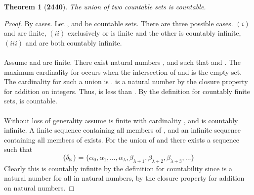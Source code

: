 \documentclass[preview]{standalone}
\newtheorem*{theorem*}{Theorem}
\begin{document}
\begin{theorem*}[\textbf{2440}]
    The union of two countable sets is countable.
\end{theorem*}

\begin{proof}
    By cases. Let , and \bm{$\Lambda$} be countable sets. 
    There are three possible cases. 
    $(i)$  and \bm{$\Lambda$} are finite, 
    $(ii)$ exclusively  or \bm{$\Lambda$} is finite and the other is countably infinite, 
    $(iii)$  and \bm{$\Lambda$} are both countably infinite.
    \\ \\
     Assume  and \bm{$\Lambda$} are finite. 
    There exist natural numbers \bm{$\lambda$}, and \bm{$\iota$} such that 
     and 
    \bm{$\big | \Lambda \big | = \iota$}. 
    The maximum cardinality for  
    occurs when the intersection of  and \bm{$\Lambda$} is 
    the empty set. The cardinality for such a union is \bm{$\lambda + \iota$}. 
    \bm{$\lambda + \iota$} is a natural number by the closure property for addition on integers. 
    Thus, \bm{$\lambda + \iota$} is less than . 
    By the definition for countably finite sets,  is countable. 
    \\ \\
     Without loss of generality assume  is finite with cardinality \bm{$\lambda$}, 
    and \bm{$\Lambda$} is countably infinite. 
    A finite sequence 
    \bm{$\big \{ \alpha_\iota \big \}$}
    containing all members of ,
    and an infinite sequence 
    containing all members of \bm{$\Lambda$}
    exists.
    For the union of  and \bm{$\Lambda$} 
    there exists a sequence \bm{$ \big \{ \delta \big \} $} such that
    \begin{equation*}
        \{ 
            \delta_\mathbb{N} 
        \} 
            = 
        \{\alpha_0, \alpha_1, \dots, \alpha_\lambda, 
        \beta_{\lambda+1}, \beta_{\lambda +2}, \beta_{\lambda + 3}, \dots \}
    \end{equation*}
    Clearly this is countably infinite by the definition for countability 
    since \bm{$\lambda + \chi$} is a natural number 
    for all \bm{$\chi$} in natural numbers, 
    by the closure property for addition on natural numbers. 

\end{proof}
\end{document}
